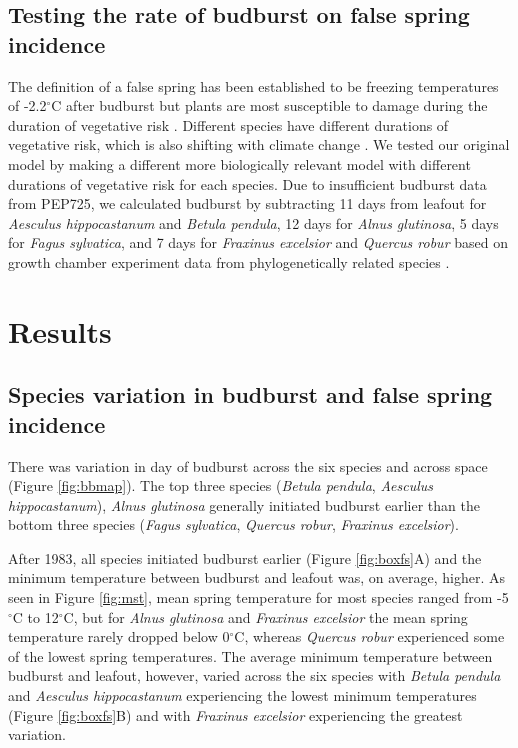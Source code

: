 \documentclass{article}\usepackage[]{graphicx}\usepackage[]{color}
\begin{document}
\subsection*{Testing the rate of budburst on false spring incidence}
The definition of a false spring has been established to be freezing temperatures of -2.2$^{\circ}$C \citep{Schwartz1993} after budburst but plants are most susceptible to damage during the duration of vegetative risk \citep{Augspurger2013, Lenz2016}. Different species have different durations of vegetative risk, which is also shifting with climate change \citep{Cleland2006, Fu2015, Xin2016}. We tested our original model by making a different more biologically relevant model with different durations of vegetative risk for each species. Due to insufficient budburst data from PEP725, we calculated budburst by subtracting 11 days from leafout for \textit{Aesculus hippocastanum} and \textit{Betula pendula}, 12 days for \textit{Alnus glutinosa}, 5 days for \textit{Fagus sylvatica}, and 7 days for \textit{Fraxinus excelsior} and \textit{Quercus robur} based on growth chamber experiment data from phylogenetically related species \citep{Buerki2010, Wang2016, Hipp2017, Flynn2018}.

\section*{Results}
\subsection*{Species variation in budburst and false spring incidence}
There was variation in day of budburst across the six species and across space (Figure \ref{fig:bbmap}). The top three species (\textit{Betula pendula}, \textit{Aesculus hippocastanum}), \textit{Alnus glutinosa} generally initiated budburst earlier than the bottom three species (\textit{Fagus sylvatica}, \textit{Quercus robur}, \textit{Fraxinus excelsior}).

After 1983, all species initiated budburst earlier (Figure \ref{fig:boxfs}A) and the minimum temperature between budburst and leafout was, on average, higher. As seen in Figure \ref{fig:mst}, mean spring temperature for most species ranged from -5$^{\circ}$C to 12$^{\circ}$C, but for \textit{Alnus glutinosa} and \textit{Fraxinus excelsior} the mean spring temperature rarely dropped below 0$^{\circ}$C, whereas \textit{Quercus robur} experienced some of the lowest spring temperatures. The average minimum temperature between budburst and leafout, however, varied across the six species with \textit{Betula pendula} and \textit{Aesculus hippocastanum} experiencing the lowest minimum temperatures (Figure \ref{fig:boxfs}B) and with \textit{Fraxinus excelsior} experiencing the greatest variation. 
\end{document}
